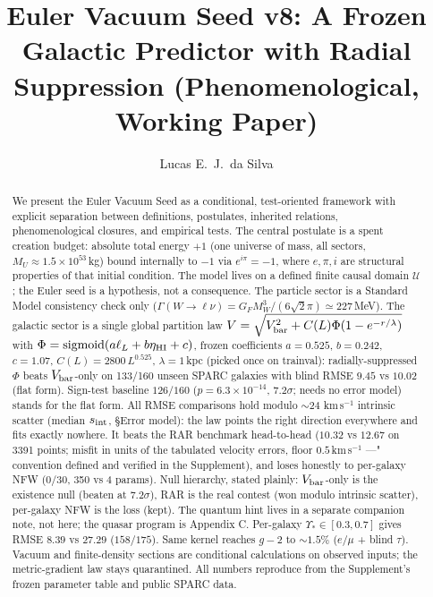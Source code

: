 \documentclass[twocolumn]{aastex631}
\begin{document}
\title{Euler Vacuum Seed v8: A Frozen Galactic Predictor with Radial Suppression (Phenomenological, Working Paper)}

\author{Lucas E.~J.~da Silva}




\begin{abstract}
We present the Euler Vacuum Seed as a conditional, test-oriented framework with explicit separation between definitions, postulates, inherited relations, phenomenological closures, and empirical tests. The central postulate is a spent creation budget: absolute total energy $+1$ (one universe of mass, all sectors, $M_U\approx1.5\times10^{53}$\,kg) bound internally to $-1$ via $e^{i\pi}=-1$, where $e,\pi,i$ are structural properties of that initial condition. The model lives on a defined finite causal domain $\mathcal U$; the Euler seed is a hypothesis, not a consequence. The particle sector is a Standard Model consistency check only ($\Gamma(W\to\ell\nu)=G_FM_W^3/(6\sqrt{2}\pi)\simeq227$\,MeV). The galactic sector is a single global partition law $V=\sqrt{V_{\rm bar}^2+C(L)\Phi(1-e^{-r/\lambda})}$ with $\Phi={\rm sigmoid}(a\ell_L+b\eta_{\rm HI}+c)$, frozen coefficients $a=0.525$, $b=0.242$, $c=1.07$, $C(L)=2800\,L^{0.525}$, $\lambda=1$\,kpc (picked once on trainval): radially-suppressed $\Phi$ beats $V_{\rm bar}$-only on 133/160 unseen SPARC galaxies with blind RMSE $\mathbf{9.45}$ vs $10.02$ (flat form). Sign-test baseline $126/160$ ($p=6.3\times10^{-14}$, $7.2\sigma$; needs no error model) stands for the flat form. All RMSE comparisons hold modulo $\sim24$ km\,s$^{-1}$ intrinsic scatter (median $s_{\rm int}$, \S Error model): the law points the right direction everywhere and fits exactly nowhere. It beats the RAR benchmark \cite{RAR2016} head-to-head ($10.32$ vs $12.67$ on 3391 points; misfit in units of the tabulated velocity errors, floor $0.5$\,km\,s$^{-1}$ ---" convention defined and verified in the Supplement), and loses honestly to per-galaxy NFW \cite{NFW1997,Katz2017} ($0/30$, 350 vs 4 params). Null hierarchy, stated plainly: $V_{\rm bar}$-only is the existence null (beaten at $7.2\sigma$), RAR is the real contest (won modulo intrinsic scatter), per-galaxy NFW is the loss (kept). The quantum hint lives in a separate companion note, not here; the quasar program is Appendix C. Per-galaxy $\Upsilon_*\in[0.3,0.7]$ \cite{Meidt2014} gives RMSE $8.39$ vs $27.29$ ($158/175$). Same kernel reaches $g-2$ \cite{PDG2024,Muong22023} to $\sim1.5\%$ ($e/\mu$ + blind $\tau$). Vacuum and finite-density sections are conditional calculations on observed inputs; the metric-gradient law stays quarantined. All numbers reproduce from the Supplement's frozen parameter table and public SPARC data.
\end{abstract}
\end{document}
